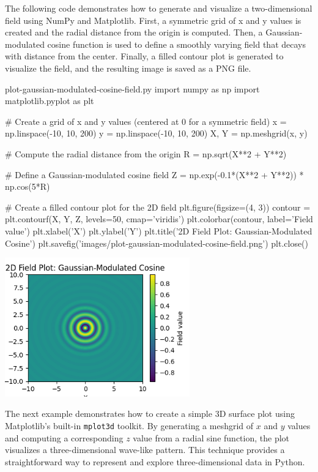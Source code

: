The following code demonstrates how to generate and visualize a two-dimensional field using NumPy and Matplotlib. First, a symmetric grid of x and y values is created and the radial distance from the origin is computed. Then, a Gaussian-modulated cosine function is used to define a smoothly varying field that decays with distance from the center. Finally, a filled contour plot is generated to visualize the field, and the resulting image is saved as a PNG file.

\begin{codeonly}{plot-gaussian-modulated-cosine-field.py}
import numpy as np
import matplotlib.pyplot as plt

# Create a grid of x and y values (centered at 0 for a symmetric field)
x = np.linspace(-10, 10, 200)
y = np.linspace(-10, 10, 200)
X, Y = np.meshgrid(x, y)

# Compute the radial distance from the origin
R = np.sqrt(X**2 + Y**2)

# Define a Gaussian-modulated cosine field
Z = np.exp(-0.1*(X**2 + Y**2)) * np.cos(5*R)

# Create a filled contour plot for the 2D field
plt.figure(figsize=(4, 3))
contour = plt.contourf(X, Y, Z, levels=50, cmap='viridis')
plt.colorbar(contour, label='Field value')
plt.xlabel('X')
plt.ylabel('Y')
plt.title('2D Field Plot: Gaussian-Modulated Cosine')
plt.savefig('images/plot-gaussian-modulated-cosine-field.png')
plt.close()
\end{codeonly}

\begin{center}
   \includegraphics[width=0.6\textwidth]{images/plot-gaussian-modulated-cosine-field.png}
\end{center}%

The next example demonstrates how to create a simple 3D surface plot using Matplotlib's built-in \texttt{mplot3d} toolkit. By generating a meshgrid of \(x\) and \(y\) values and computing a corresponding \(z\) value from a radial sine function, the plot visualizes a three-dimensional wave-like pattern. This technique provides a straightforward way to represent and explore three-dimensional data in Python.

